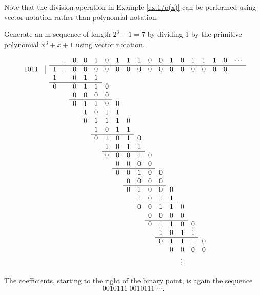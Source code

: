 {Note that the division operation in Example \ref{ex:1/p(x)}
can be performed using vector notation rather than polynomial notation.

\begin{example}
Generate an m-sequence of length $2^3-1=7$ by dividing 1 by the primitive polynomial
$x^3+x+1$ using vector notation.

\begin{fsL}
\[
\begin{array}{rrllllllllllllllllllllllllllllllllllll}
           &   &   &.&0&0&1&0&1&1&1 &0&0&1&0&1&1&1 &0&\cdots \\
   \cline{3-20}
   1011    &\vline   & 1 &.&0&0&0&0&0&0&0 &0&0&0&0&0&0&0 &0 \\
           &   & 1 & &0&1&1 \\
   \cline{3-7}
           &   & 0 & &0&1&1&0 \\
           &   &   & &0&0&0&0 \\
   \cline{5-8}
           &   &   & &0&1&1&0&0 \\
           &   &   & & &1&0&1&1 \\
   \cline{6-9}
           &   &   & & &0&1&1&1&0 \\
           &   &   & & & &1&0&1&1 \\
   \cline{7-10}
           &   &   & & & &0&1&0&1&0 \\
           &   &   & & & & &1&0&1&1 \\
   \cline{8-11}
           &   &   & & & & &0&0&0&1&0 \\
           &   &   & & & & & &0&0&0&0 \\
   \cline{9-12}
           &   &   & & & & & &0&0&1&0&0 \\
           &   &   & & & & & & &0&0&0&0 \\
   \cline{10-13}
           &   &   & & & & & & &0&1&0&0&0 \\
           &   &   & & & & & & & &1&0&1&1 \\
   \cline{11-14}
           &   &   & & & & & & & &0&0&1&1&0 \\
           &   &   & & & & & & & & &0&0&0&0 \\
   \cline{12-15}
           &   &   & & & & & & & & &0&1&1&0&0 \\
           &   &   & & & & & & & & & &1&0&1&1 \\
   \cline{13-16}
           &   &   & & & & & & & & & &0&1&1&1&0 \\
           &   &   & & & & & & & & & & &0&0&0&0 \\
           &   &   & & & & & & & & & & & &\vdots& &  \\
\end{array}
\]
\end{fsL}

The coefficients, starting to the right of the binary point,
is again the sequence
\[ 0010111 \; 0010111 \; \cdots. \]
\end{example}

} %

